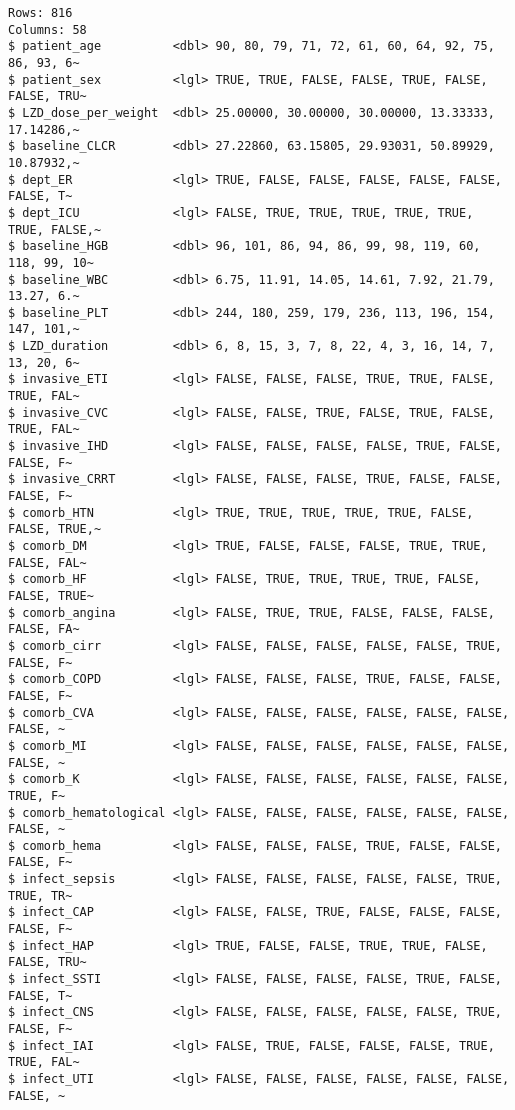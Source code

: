 \documentclass[
  letterpaper,
  DIV=11,
  numbers=noendperiod]{scrartcl}
\begin{document}
\begin{verbatim}
Rows: 816
Columns: 58
$ patient_age          <dbl> 90, 80, 79, 71, 72, 61, 60, 64, 92, 75, 86, 93, 6~
$ patient_sex          <lgl> TRUE, TRUE, FALSE, FALSE, TRUE, FALSE, FALSE, TRU~
$ LZD_dose_per_weight  <dbl> 25.00000, 30.00000, 30.00000, 13.33333, 17.14286,~
$ baseline_CLCR        <dbl> 27.22860, 63.15805, 29.93031, 50.89929, 10.87932,~
$ dept_ER              <lgl> TRUE, FALSE, FALSE, FALSE, FALSE, FALSE, FALSE, T~
$ dept_ICU             <lgl> FALSE, TRUE, TRUE, TRUE, TRUE, TRUE, TRUE, FALSE,~
$ baseline_HGB         <dbl> 96, 101, 86, 94, 86, 99, 98, 119, 60, 118, 99, 10~
$ baseline_WBC         <dbl> 6.75, 11.91, 14.05, 14.61, 7.92, 21.79, 13.27, 6.~
$ baseline_PLT         <dbl> 244, 180, 259, 179, 236, 113, 196, 154, 147, 101,~
$ LZD_duration         <dbl> 6, 8, 15, 3, 7, 8, 22, 4, 3, 16, 14, 7, 13, 20, 6~
$ invasive_ETI         <lgl> FALSE, FALSE, FALSE, TRUE, TRUE, FALSE, TRUE, FAL~
$ invasive_CVC         <lgl> FALSE, FALSE, TRUE, FALSE, TRUE, FALSE, TRUE, FAL~
$ invasive_IHD         <lgl> FALSE, FALSE, FALSE, FALSE, TRUE, FALSE, FALSE, F~
$ invasive_CRRT        <lgl> FALSE, FALSE, FALSE, TRUE, FALSE, FALSE, FALSE, F~
$ comorb_HTN           <lgl> TRUE, TRUE, TRUE, TRUE, TRUE, FALSE, FALSE, TRUE,~
$ comorb_DM            <lgl> TRUE, FALSE, FALSE, FALSE, TRUE, TRUE, FALSE, FAL~
$ comorb_HF            <lgl> FALSE, TRUE, TRUE, TRUE, TRUE, FALSE, FALSE, TRUE~
$ comorb_angina        <lgl> FALSE, TRUE, TRUE, FALSE, FALSE, FALSE, FALSE, FA~
$ comorb_cirr          <lgl> FALSE, FALSE, FALSE, FALSE, FALSE, TRUE, FALSE, F~
$ comorb_COPD          <lgl> FALSE, FALSE, FALSE, TRUE, FALSE, FALSE, FALSE, F~
$ comorb_CVA           <lgl> FALSE, FALSE, FALSE, FALSE, FALSE, FALSE, FALSE, ~
$ comorb_MI            <lgl> FALSE, FALSE, FALSE, FALSE, FALSE, FALSE, FALSE, ~
$ comorb_K             <lgl> FALSE, FALSE, FALSE, FALSE, FALSE, FALSE, TRUE, F~
$ comorb_hematological <lgl> FALSE, FALSE, FALSE, FALSE, FALSE, FALSE, FALSE, ~
$ comorb_hema          <lgl> FALSE, FALSE, FALSE, TRUE, FALSE, FALSE, FALSE, F~
$ infect_sepsis        <lgl> FALSE, FALSE, FALSE, FALSE, FALSE, TRUE, TRUE, TR~
$ infect_CAP           <lgl> FALSE, FALSE, TRUE, FALSE, FALSE, FALSE, FALSE, F~
$ infect_HAP           <lgl> TRUE, FALSE, FALSE, TRUE, TRUE, FALSE, FALSE, TRU~
$ infect_SSTI          <lgl> FALSE, FALSE, FALSE, FALSE, TRUE, FALSE, FALSE, T~
$ infect_CNS           <lgl> FALSE, FALSE, FALSE, FALSE, FALSE, TRUE, FALSE, F~
$ infect_IAI           <lgl> FALSE, TRUE, FALSE, FALSE, FALSE, TRUE, TRUE, FAL~
$ infect_UTI           <lgl> FALSE, FALSE, FALSE, FALSE, FALSE, FALSE, FALSE, ~

\end{verbatim}
\end{document}
